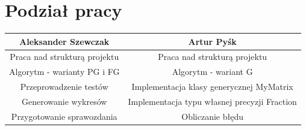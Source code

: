 \documentclass[11pt]{article}
\begin{document}
\section{Podział pracy}
\begin{center}
 \begin{tabular}{|c | c|} 
 \hline
 Aleksander Szewczak & Artur Pyśk  \\ 
 \hline\hline
 Praca nad strukturą projektu & Praca nad strukturą projektu  \\ 
 \hline
 Algorytm - warianty PG i FG & Algorytm - wariant G  \\
 \hline
 Przeprowadzenie testów & Implementacja klasy generycznej MyMatrix  \\
 \hline
 Generowanie wykresów & Implementacja typu własnej precyzji Fraction \\
 \hline
 Przygotowanie sprawozdania & Obliczanie błędu  \\ 
 \hline
\end{tabular}
\end{center}
\end{document}
